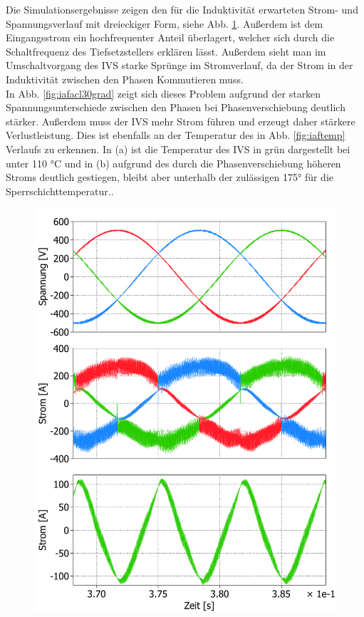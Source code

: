 Die Simulationsergebnisse zeigen den für die Induktivität erwarteten Strom- und Spannungsverlauf mit dreieckiger Form, siehe Abb. \ref{fig:iafacl}. Außerdem ist dem Eingangsstrom ein hochfrequenter Anteil überlagert, welcher sich durch die Schaltfrequenz des Tiefsetzstellers erklären lässt. Außerdem sieht man im Umschaltvorgang des \gls{IVS} starke Sprünge im Stromverlauf, da der Strom in der Induktivität zwischen den Phasen Kommutieren muss.\\
In Abb. \ref{fig:iafacl30grad} zeigt sich dieses Problem aufgrund der starken Spannungsunterschiede zwischen den Phasen bei Phasenverschiebung deutlich stärker. Außerdem muss der \gls{IVS} mehr Strom führen und erzeugt daher stärkere Verlustleistung. Dies ist ebenfalls an der Temperatur des in Abb. \ref{fig:iaftemp} Verlaufs zu erkennen. In (a) ist die Temperatur des IVS in grün dargestellt bei unter 110 °C und in (b) aufgrund des durch die Phasenverschiebung höheren Stroms deutlich gestiegen, bleibt aber unterhalb der zulässigen 175° für die Sperrschichttemperatur..
\begin{figure}
	\centering
	\includegraphics[width=1\linewidth]{content/Grafiken/IAF_AC+L}
	\caption[Simulationsergebnisse des IAF ohne Phasenverschiebung, Eingangsspannung und Ströme, Strom in der IVS Induktivität ]{}
	\label{fig:iafacl}
\end{figure}

